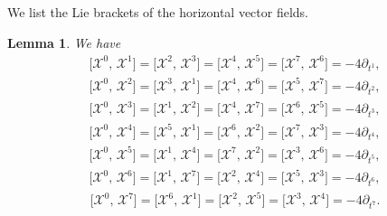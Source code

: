 \documentclass[reqno,12pt]{amsart}
\numberwithin{equation}{section}
\theoremstyle{plain}
\newtheorem{lemma}[theorem]{Lemma}
\theoremstyle{definition}
\begin{document}
We list the Lie brackets of the horizontal vector fields.
\begin{lemma}\label{lemma2.1}
We have
  \begin{equation*}
      \begin{aligned}
\big[\mathscr{X}^0,\,\mathscr{X}^1\big]=\big[\mathscr{X}^2,\,\mathscr{X}^3\big]=\big[\mathscr{X}^4,\,\mathscr{X}^5\big]=\big[\mathscr{X}^7,\,\mathscr{X}^6\big]=-4\partial_{t^1},
      \end{aligned}
  \end{equation*}
  \begin{equation*}
      \begin{aligned}
\big[\mathscr{X}^0,\,\mathscr{X}^2\big]=\big[\mathscr{X}^3,\,\mathscr{X}^1\big]=\big[\mathscr{X}^4,\,\mathscr{X}^6\big]=\big[\mathscr{X}^5,\,\mathscr{X}^7\big]=-4\partial_{t^2},
      \end{aligned}
  \end{equation*}
  \begin{equation*}
      \begin{aligned}
\big[\mathscr{X}^0,\,\mathscr{X}^3\big]=\big[\mathscr{X}^1,\,\mathscr{X}^2\big]=\big[\mathscr{X}^4,\,\mathscr{X}^7\big]=\big[\mathscr{X}^6,\,\mathscr{X}^5\big]=-4\partial_{t^3},
      \end{aligned}
  \end{equation*}
  \begin{equation*}
      \begin{aligned}
\big[\mathscr{X}^0,\,\mathscr{X}^4\big]=\big[\mathscr{X}^5,\,\mathscr{X}^1\big]=\big[\mathscr{X}^6,\,\mathscr{X}^2\big]=\big[\mathscr{X}^7,\,\mathscr{X}^3\big]=-4\partial_{t^4},
      \end{aligned}
  \end{equation*}
  \begin{equation*}
      \begin{aligned}
\big[\mathscr{X}^0,\,\mathscr{X}^5\big]=\big[\mathscr{X}^1,\,\mathscr{X}^4\big]=\big[\mathscr{X}^7,\,\mathscr{X}^2\big]=\big[\mathscr{X}^3,\,\mathscr{X}^6\big]=-4\partial_{t^5},
      \end{aligned}
  \end{equation*}
  \begin{equation*}
      \begin{aligned}
\big[\mathscr{X}^0,\,\mathscr{X}^6\big]=\big[\mathscr{X}^1,\,\mathscr{X}^7\big]=\big[\mathscr{X}^2,\,\mathscr{X}^4\big]=\big[\mathscr{X}^5,\,\mathscr{X}^3\big]=-4\partial_{t^6},
      \end{aligned}
  \end{equation*}
  \begin{equation*}
\begin{aligned}
\big[\mathscr{X}^0,\,\mathscr{X}^7\big]=\big[\mathscr{X}^6,\,\mathscr{X}^1\big]=\big[\mathscr{X}^2,\,\mathscr{X}^5\big]=\big[\mathscr{X}^3,\,\mathscr{X}^4\big]=-4\partial_{t^7}.
      \end{aligned}
  \end{equation*}
\end{lemma}
\end{document}
